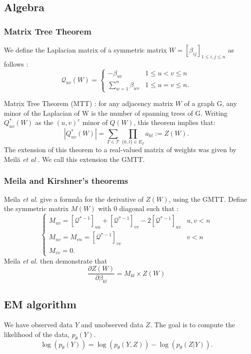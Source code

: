 \documentclass[a4paper,11pt]{article}
\begin{document}
  \subsection{Algebra}
    \subsubsection{Matrix Tree Theorem}
    We define the Laplacian matrix of a symmetric matrix $W=[\beta_{ij}]_{1\leq i,j\leq n}$ as follows :
 \[\mathcal{Q}_{uv}(W)=\begin{cases}
               -\beta_{uv} & 1\leq u<v \leq n\\
               \sum_{w=1}^n \beta_{wv} & 1\leq u=v \leq n.
            \end{cases}\]
    
    Matrix Tree Theorem (MTT) \cite{kirch}: for any adjacency matrix $W$ of a graph G, any minor of the Laplacian of W is the number 
    of spanning trees of G. Writing $Q^*_{uv}(W)$ as the $(u,v)^e$ minor of $Q(W)$, this theorem implies that:
    \[ |Q^*_{uv}(W)|=\sum_{T\in\mathcal{T}} \prod_{\{k,l\}\in E_T} a_{kl} := Z(W).\]
   The extension of this theorem to a real-valued matrix of weights was given by Meil{\u{a}} \textit{et al} \cite{meila}.
 We call this extension the GMTT.
    \subsubsection{Meila and Kirshner's theorems}
    
     Meila \textit{et al.} give a formula for the derivative of $Z(W)$, using the GMTT. Define the symmetric matrix  $M(W)$ 
     with 0 diagonal such that :
 \[\begin{cases}
    M_{uv} = [\mathcal{Q}^{*-1}]_{uu} + [\mathcal{Q}^{*-1}]_{vv} -2[\mathcal{Q}^{*-1}]_{uv} & u,v < n\\
    M_{nv} =M_{vn} =[\mathcal{Q}^{*-1}]_{vv} & v<n\\
     M_{vv} =0.
   \end{cases}\]
Meila \textit{et al.} then demonstrate that 
\begin{equation}
\label{meila}
 \frac{\partial Z(W)}{\partial \beta_{kl}} = M_{kl} \times Z(W)
\end{equation}


  \subsection{EM algorithm}

We have observed data $Y$ and unobserved data $Z$. The goal is to compute the likelihood of the data, $p_\theta (Y)$.
\[ \log(p_\theta (Y)) = \log (p_\theta (Y,Z)) - \log(p_\theta (Z|Y)).\]
\end{document}
